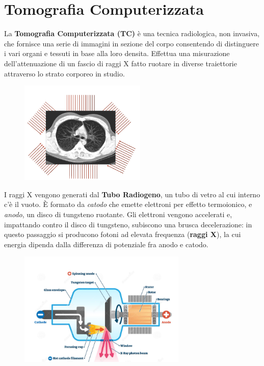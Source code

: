 \chapter{Tomografia Computerizzata}

La \textbf{Tomografia Computerizzata (TC)} è una tecnica radiologica, non
invasiva, che fornisce una serie di immagini in sezione del corpo
consentendo di distinguere i vari organi e tessuti in base alla loro
densita. Effettua una misurazione dell'attenuazione di un fascio di raggi X
fatto ruotare in diverse traiettorie attraverso lo strato corporeo in studio.

\begin{figure}[H]
    \centering
    \includegraphics[width=6cm, keepaspectratio]{capitoli/immagini/imgs/tc1.png}
\end{figure}

I raggi X vengono generati dal \textbf{Tubo Radiogeno}, un tubo di vetro al
cui interno c'è il vuoto. È
formato da \textit{catodo} che emette elettroni
per effetto termoionico, e \textit{anodo}, un disco di
tungsteno ruotante. Gli elettroni vengono accelerati e, impattando
contro il disco di tungsteno, subiscono una brusca decelerazione: in
questo passaggio si producono fotoni ad elevata frequenza (\textbf{raggi
    X}), la cui energia dipenda dalla differenza di potenziale fra anodo e
catodo.

\begin{figure}[H]
    \centering
    \includegraphics[width=8cm, keepaspectratio]{capitoli/immagini/imgs/tubo.png}
\end{figure}

